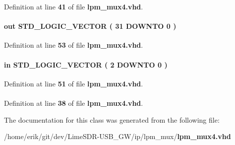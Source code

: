 Definition at line {\bf 41} of file {\bf lpm\+\_\+mux4.\+vhd}.

\paragraph[{result}]{ {\bfseries \textcolor{keywordflow}{out}\textcolor{vhdlchar}{ }} {\bfseries \textcolor{comment}{S\+T\+D\+\_\+\+L\+O\+G\+I\+C\+\_\+\+V\+E\+C\+T\+OR}\textcolor{vhdlchar}{ }\textcolor{vhdlchar}{(}\textcolor{vhdlchar}{ }\textcolor{vhdlchar}{ } \textcolor{vhdldigit}{31} \textcolor{vhdlchar}{ }\textcolor{keywordflow}{D\+O\+W\+N\+TO}\textcolor{vhdlchar}{ }\textcolor{vhdlchar}{ } \textcolor{vhdldigit}{0} \textcolor{vhdlchar}{ }\textcolor{vhdlchar}{)}\textcolor{vhdlchar}{ }} \hspace{0.3cm}{\ttfamily [Port]}}\label{classlpm__mux4_a9ec800ffe2090dc0d0146bd13335a4c8}


Definition at line {\bf 53} of file {\bf lpm\+\_\+mux4.\+vhd}.

\paragraph[{sel}]{ {\bfseries \textcolor{keywordflow}{in}\textcolor{vhdlchar}{ }} {\bfseries \textcolor{comment}{S\+T\+D\+\_\+\+L\+O\+G\+I\+C\+\_\+\+V\+E\+C\+T\+OR}\textcolor{vhdlchar}{ }\textcolor{vhdlchar}{(}\textcolor{vhdlchar}{ }\textcolor{vhdlchar}{ } \textcolor{vhdldigit}{2} \textcolor{vhdlchar}{ }\textcolor{keywordflow}{D\+O\+W\+N\+TO}\textcolor{vhdlchar}{ }\textcolor{vhdlchar}{ } \textcolor{vhdldigit}{0} \textcolor{vhdlchar}{ }\textcolor{vhdlchar}{)}\textcolor{vhdlchar}{ }} \hspace{0.3cm}{\ttfamily [Port]}}\label{classlpm__mux4_a49e4f981c1e86365352bbe8dd65e2e74}


Definition at line {\bf 51} of file {\bf lpm\+\_\+mux4.\+vhd}.

\paragraph[{std\+\_\+logic\+\_\+1164}]{\hspace{0.3cm}{\ttfamily [Package]}}\label{classlpm__mux4_acd03516902501cd1c7296a98e22c6fcb}


Definition at line {\bf 38} of file {\bf lpm\+\_\+mux4.\+vhd}.



The documentation for this class was generated from the following file\+:\begin{DoxyCompactItemize}
\item 
/home/erik/git/dev/\+Lime\+S\+D\+R-\/\+U\+S\+B\+\_\+\+G\+W/ip/lpm\+\_\+mux/{\bf lpm\+\_\+mux4.\+vhd}\end{DoxyCompactItemize}
